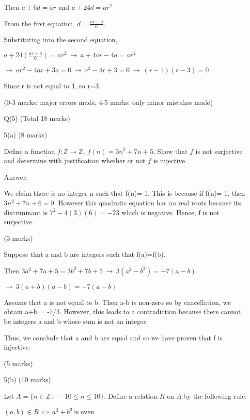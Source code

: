 \documentclass[a4paper,12pt,oneside]{book}
\theoremstyle{definition}
\begin{document}
Then $a + 6d = ar$ and $a + 24d = ar^2$

From the first equation, $d = \frac{ar-a}{6}$.

Substituting into the second equation,

$a+24(\frac{ar-a}{6}) = ar^2 \ \longrightarrow \ a + 4ar - 4a = ar^2$ 

$\longrightarrow \  ar^2 - 4ar + 3a = 0 \ \longrightarrow \ r^2 - 4r + 3 = 0 \ \longrightarrow  \ (r-1)(r-3)=0$

Since r is not equal to 1, so r=3.
 
(0-3 marks: major errors made, 4-5 marks: only minor mistakes made)







\newpage

Q(5) (Total 18 marks)

5(a) (8 marks)

Define a function $f : \mathbb{Z} \rightarrow \mathbb{Z}$, $f(n) = 3n^2 + 7n + 5$. Show that $f$ is not surjective and determine with justification whether or not $f$ is injective.

Answer:

We claim there is no integer n such that f(n)=-1. This is because if f(n)=-1, then $3n^2 + 7n + 6=0$. However this quadratic equation has no real roots because its discriminant is $7^2 - 4(3)(6) = -23$ which is negative. Hence, f is not surjective.

(3 marks)

Suppose that a and b are integers such that f(a)=f(b).

Then $3a^2 + 7a + 5 = 3b^2 + 7b + 5 \ \longrightarrow  \ 3(a^2-b^2) = -7(a-b)$

$\longrightarrow \ 3(a+b)(a-b) = -7(a-b)$

Assume that a is not equal to b. Then a-b is non-zero so by cancellation, we obtain a+b = -7/3. However, this leads to a contradiction because there cannot be integers a and b whose sum is not an integer. 

Thus, we conclude that a and b are equal and so we have proven that f is injective. 

(5 marks)

5(b) (10 marks)

Let $A = \{ n \in \mathbb{Z} \ : \ -10 \leq n \leq 10 \}$. Define a relation $R$ on $A$ by the following rule:

$(a,b) \in R \ \Leftrightarrow \ a^3+b^3 \ \text{is even}$
\end{document}
